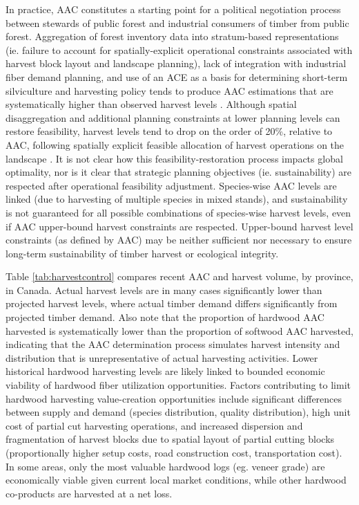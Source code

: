In practice, AAC constitutes a starting point for a political
negotiation process between stewards of public forest and industrial
consumers of timber from public forest. Aggregation of forest
inventory data into stratum-based representations (ie. failure to
account for spatially-explicit operational constraints associated with
harvest block layout and landscape planning), lack of integration with
industrial fiber demand planning, and use of an ACE as a basis for
determining short-term silviculture and harvesting policy tends to
produce AAC estimations that are systematically higher than observed
harvest levels \citep{ccfm2005wood}. Although spatial disaggregation
and additional planning constraints at lower planning levels can
restore feasibility, harvest levels tend to drop on the order of 20\%,
relative to AAC, following spatially explicit feasible allocation of
harvest operations on the landscape \citep{walters2001empirical}. It
is not clear how this feasibility-restoration process impacts global
optimality, nor is it clear that strategic planning objectives
(ie. sustainability) are respected after operational feasibility
adjustment. Species-wise AAC levels are linked (due to harvesting of
multiple species in mixed stands), and sustainability is not
guaranteed for all possible combinations of species-wise harvest
levels, even if AAC upper-bound harvest constraints are
respected. Upper-bound harvest level constraints (as defined by AAC)
may be neither sufficient nor necessary to ensure long-term
sustainability of timber harvest or ecological integrity.

Table \ref{tab:harvestcontrol} compares recent AAC and harvest volume,
by province, in Canada. Actual harvest levels are in many cases
significantly lower than projected harvest levels, where actual timber
demand differs significantly from projected timber demand.  Also note
that the proportion of hardwood AAC harvested is systematically lower than the
proportion of softwood AAC harvested, indicating that the AAC
determination process simulates harvest intensity and distribution
that is unrepresentative of actual harvesting activities.  Lower
historical hardwood harvesting levels are likely linked to bounded
economic viability of hardwood fiber utilization
opportunities. Factors contributing to limit hardwood harvesting
value-creation opportunities include significant differences between
supply and demand (species distribution, quality distribution), high
unit cost of partial cut harvesting operations, and increased
dispersion and fragmentation of harvest blocks due to spatial layout
of partial cutting blocks (proportionally higher setup costs, road
construction cost, transportation cost). In some areas, only the most
valuable hardwood logs (eg. veneer grade) are economically viable
given current local market conditions, while other hardwood
co-products are harvested at a net loss.



